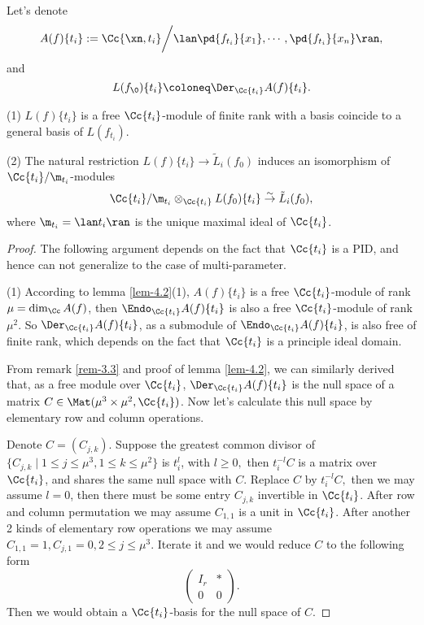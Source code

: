 Let's denote
\[A(f)\{t_i\} : = \Cc\{\xn, t_i\} \bigg / \lan \pd{f_{t_i}}{x_1} , \cdots, \pd {f_{t_i}} {x_n} \ran,\]
and
\[L(f_\0)\{t_i\}\coloneq  \Der_{\Cc\{t_i\}} A(f)\{ t_i \}.\]
\begin{lemma}\label{lem-4.9}
\item[(1)]$L(f)\{t_i\}$ is a free $\Cc\{t_i\}$-module of finite rank with a basis coincide to a general basis of $L(f_{t_i})$.
\item[(2)] The natural restriction $L(f)\{t_i\} \to \tilde L_i(f_0)$ induces an isomorphism of $\Cc\{t_i\}/\m_{t_i}$-modules
  \[\Cc\{t_i\}/\m_{t_i} \otimes_{\Cc\{t_i\}} L(f_0)\{t_i\} \stackrel{\sim}\to \tilde L_i(f_0),\]
  where $\m_{t_i} = \lan t_i \ran$ is the unique maximal ideal of $\Cc\{t_i\}$.
\end{lemma}
\begin{proof}
  The following argument depends on the fact that $\Cc\{t_i\}$ is a PID, and hence can not generalize to the case of multi-parameter.
\item[(1)]
  According to lemma \ref{lem-4.2}(1), $A(f)\{t_i\}$ is a free $\Cc\{t_i\}$-module of rank $\mu=\dim_\Cc A(f)$, then $\Endo_{\Cc\{t_i\}} A(f)\{t_i\}$ is also a free $\Cc\{t_i\}$-module of rank $\mu^2$. So $\Der_{\Cc\{t_i\}} A(f)\{t_i\}$, as a  submodule of  $\Endo_{\Cc\{t_i\}} A(f)\{t_i\}$, is also free of finite rank, which depends on the fact that $\Cc\{t_i\}$ is a principle ideal domain.

  From remark \ref{rem-3.3} and proof of lemma \ref{lem-4.2}, we can similarly derived that, as a free module over $\Cc\{t_i\}$, $\Der_{\Cc\{t_i\}} A(f)\{t_i\}$ is the null space of a matrix $C\in \Mat(\mu^3\times \mu^2, \Cc\{t_i\})$. Now let's calculate this null space by elementary row and column operations.

  Denote $C=(C_{j,k})$. Suppose the greatest common divisor of $\{C_{j,k}\mid 1\leqslant j \leqslant \mu^3, 1\leqslant k \leqslant \mu^2\}$ is $t_i^l$, with $l\geqslant 0,$ then $t_i^{-l}C$ is a matrix over $\Cc\{t_i\}$, and shares the same null space with $C$. Replace $C$ by $t^{-l}_i C,$ then we may assume $l=0$, then there must be some entry $C_{j,k}$ invertible in $\Cc\{t_i\}$. After row and column permutation we may assume $C_{1,1}$ is a unit in $\Cc\{t_i\}$. After another 2 kinds of elementary row operations we may assume $C_{1,1}=1, C_{j,1}=0, 2\leqslant j\leqslant \mu^3$. Iterate it and we would reduce $C$ to the following form
  \[\begin{pmatrix}
    I_r& *\\
    0 & 0
  \end{pmatrix}.\]
  Then we would obtain a $\Cc\{t_i\}$-basis for the null space of $C$.


\end{proof}
